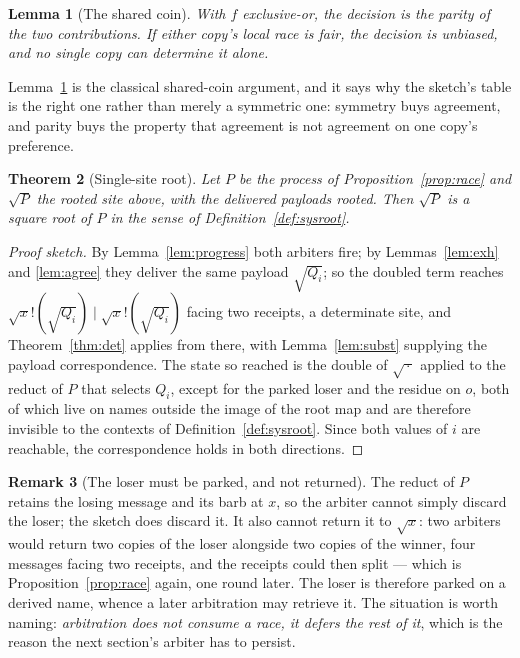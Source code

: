 \documentclass[11pt]{article}
\newtheorem{theorem}{Theorem}[section]
\newtheorem{lemma}[theorem]{Lemma}
\theoremstyle{definition}
\newtheorem{remark}[theorem]{Remark}
\newcommand{\rt}[1]{\sqrt{#1}}
\begin{document}
\begin{lemma}[The shared coin]\label{lem:coin}
With $f$ exclusive-or, the decision is the parity of the two contributions. If either copy's local race is fair, the decision is unbiased, and no single copy can determine it alone.
\end{lemma}

Lemma~\ref{lem:coin} is the classical shared-coin argument, and it says why the sketch's table is the right one rather than merely a symmetric one: symmetry buys agreement, and parity buys the property that agreement is not agreement on one copy's preference.

\begin{theorem}[Single-site root]\label{thm:site}
Let $P$ be the process of Proposition~\ref{prop:race} and $\rt{P}$ the rooted site above, with the delivered payloads rooted. Then $\rt{P}$ is a square root of $P$ in the sense of Definition~\ref{def:sysroot}.
\end{theorem}

\begin{proof}[Proof sketch]
By Lemma~\ref{lem:progress} both arbiters fire; by Lemmas~\ref{lem:exh} and \ref{lem:agree} they deliver the same payload $\rt{Q_i}$; so the doubled term reaches $\rt{x}!(\rt{Q_i}) \mid \rt{x}!(\rt{Q_i})$ facing two receipts, a determinate site, and Theorem~\ref{thm:det} applies from there, with Lemma~\ref{lem:subst} supplying the payload correspondence. The state so reached is the double of $\rt{\,\cdot\,}$ applied to the reduct of $P$ that selects $Q_i$, except for the parked loser and the residue on $o$, both of which live on names outside the image of the root map and are therefore invisible to the contexts of Definition~\ref{def:sysroot}. Since both values of $i$ are reachable, the correspondence holds in both directions.
\end{proof}

\begin{remark}[The loser must be parked, and not returned]\label{rem:loser}
The reduct of $P$ retains the losing message and its barb at $x$, so the arbiter cannot simply discard the loser; the sketch does discard it. It also cannot return it to $\rt{x}$: two arbiters would return two copies of the loser alongside two copies of the winner, four messages facing two receipts, and the receipts could then split --- which is Proposition~\ref{prop:race} again, one round later. The loser is therefore parked on a derived name, whence a later arbitration may retrieve it. The situation is worth naming: \emph{arbitration does not consume a race, it defers the rest of it}, which is the reason the next section's arbiter has to persist.
\end{remark}
\end{document}
